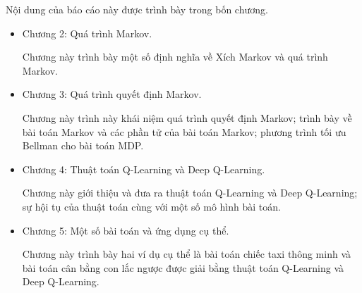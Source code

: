 		
	Nội dung của báo cáo này được trình bày trong bốn chương. 
\begin{itemize}
	\item Chương 2: Quá trình Markov.
	
	Chương này trình bày một số định nghĩa về Xích Markov và quá trình Markov.
	
	\item Chương 3: Quá trình quyết định Markov.
	
	Chương này trình này khái niệm quá trình quyết định Markov; trình bày về bài toán Markov và các phần tử của bài toán Markov; phương trình tối ưu Bellman cho bài toán MDP. 
	
	\item Chương 4: Thuật toán Q-Learning và Deep Q-Learning.
	
	Chương này giới thiệu và đưa ra thuật toán Q-Learning và Deep Q-Learning; sự hội tụ của thuật toán cùng với một số mô hình bài toán.
	
	\item Chương 5: Một số bài toán và ứng dụng cụ thể.
	
	Chương này trình bày hai ví dụ cụ thể là bài toán chiếc taxi thông minh và bài toán cân bằng con lắc ngược được giải bằng thuật toán Q-Learning và Deep Q-Learning.
\end{itemize}
